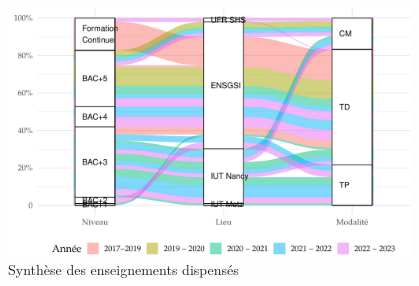 \documentclass[
  11pt,
]{article}
\begin{document}
\begin{figure}[H]

{\centering \includegraphics[width=0.95\textwidth,height=\textheight]{Figures/fig-sankey-1.pdf}

}

\caption{\label{fig-sankey}Synthèse des enseignements dispensés}

\end{figure}

\renewcommand{\arraystretch}{0.7}
\end{document}
